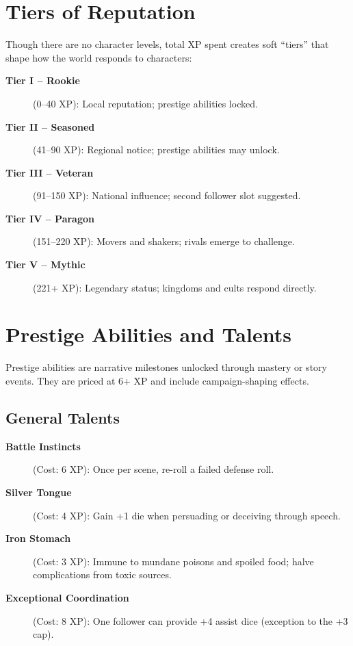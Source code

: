 \section{Tiers of Reputation}
\label{sec:reputation-tiers}

Though there are no character levels, total XP spent creates soft ``tiers'' that shape how the world responds to characters:

\begin{description}
\item[\textbf{Tier I -- Rookie}] (0--40 XP): Local reputation; prestige abilities locked.
\item[\textbf{Tier II -- Seasoned}] (41--90 XP): Regional notice; prestige abilities may unlock.
\item[\textbf{Tier III -- Veteran}] (91--150 XP): National influence; second follower slot suggested.
\item[\textbf{Tier IV -- Paragon}] (151--220 XP): Movers and shakers; rivals emerge to challenge.
\item[\textbf{Tier V -- Mythic}] (221+ XP): Legendary status; kingdoms and cults respond directly.
\end{description}

\section{Prestige Abilities and Talents}
\label{sec:prestige-abilities}

Prestige abilities are narrative milestones unlocked through mastery or story events. They are priced at 6+ XP and include campaign-shaping effects. 

\subsection{General Talents}
\label{subsec:general-talents}

\begin{description}
\item[\textbf{Battle Instincts}] (Cost: 6 XP): Once per scene, re-roll a failed defense roll.
\item[\textbf{Silver Tongue}] (Cost: 4 XP): Gain +1 die when persuading or deceiving through speech.
\item[\textbf{Iron Stomach}] (Cost: 3 XP): Immune to mundane poisons and spoiled food; halve complications from toxic sources.
\item[\textbf{Exceptional Coordination}] (Cost: 8 XP): One follower can provide +4 assist dice (exception to the +3 cap).
\end{description}


